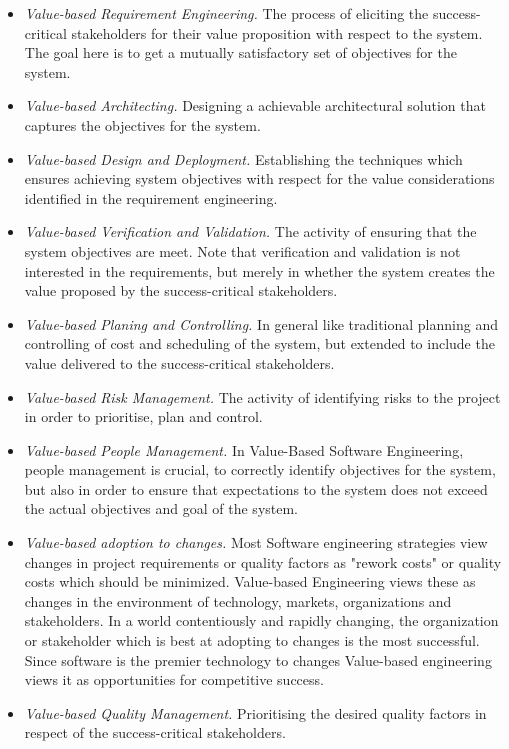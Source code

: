 \documentclass{sig-alternate}
\begin{document}
\begin{itemize}
\item \textit{Value-based Requirement Engineering.} The process of eliciting the success-critical stakeholders for their value proposition with respect to the system. The goal here is to get a mutually satisfactory set of objectives for the system.
\item \textit{Value-based Architecting.} Designing a achievable architectural solution that captures the objectives for the system. 
\item \textit{Value-based Design and Deployment.} Establishing the techniques which ensures achieving system objectives with respect for the value considerations identified in the requirement engineering.
\item \textit{Value-based Verification and Validation.} The activity of ensuring that the system objectives are meet. Note that verification and validation is not interested in the requirements, but merely in whether the system creates the value proposed by the success-critical stakeholders.  
\item \textit{Value-based Planing and Controlling.} In general like traditional planning and controlling of cost and scheduling of the system, but extended to include the value delivered to the success-critical stakeholders.
\item \textit{Value-based Risk Management.} The activity of identifying risks to the project in order to prioritise, plan and control.
\item \textit{Value-based People Management.} In Value-Based Software Engineering, people management is crucial, to correctly identify objectives for the system, but also in order to ensure that expectations to the system does not exceed the actual objectives and goal of the system. 
\item \textit{Value-based adoption to changes.} Most Software engineering strategies view changes in  project requirements or quality factors as "rework costs" or quality costs which should be minimized. Value-based Engineering views these as changes in the environment of technology, markets, organizations and stakeholders. In a world contentiously and rapidly changing, the organization or stakeholder which is best at adopting to changes is the most successful. Since software is the premier technology to changes \cite{boehm:valuebased} Value-based engineering views it as opportunities for competitive success.
\item \textit{Value-based Quality Management.} Prioritising the desired quality factors in respect of the success-critical stakeholders.
\end{itemize} 
\end{document}
